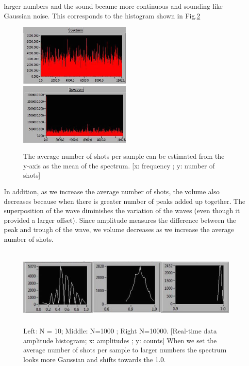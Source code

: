 \documentclass[authoryear, 12pt,5p, times]{elsarticle}
\begin{document}
larger numbers and the sound became more continuous and sounding like Gaussian noise. This corresponds to the histogram shown in Fig.\ref{shot}
 \begin{figure}[h!]
 \centering
 \includegraphics[width=0.5\textwidth]{figure/N_1000_shot_spectrum.JPG}
  \includegraphics[width=0.5\textwidth]{figure/N_100000_shot_spectrum.JPG} 
\caption{The average number of shots per sample can be estimated from the y-axis as the mean of the spectrum. [x: frequency ; y: number of shots] }
\label{spectrum}
 \end{figure}
 \par In addition, as we increase the average number of shots, the volume also decreases because when there is greater number of peaks added up together. The superposition of the wave diminishes the variation of the waves (even though it provided a larger offset). Since amplitude measures the difference between the peak and trough of the wave, we volume decreases as we increase the average number of shots. 
 \begin{figure}[h!]
  \includegraphics[width=\textwidth,height=4cm]{figure/shot.png}
\caption{Left: N = 10; Middle: N=1000 ; Right N=10000.  [Real-time data amplitude histogram; x: amplitudes ; y: counts] When we set the average number of shots per sample to larger numbers the spectrum looks more Gaussian and shifts towards the 1.0.}
\label{shot}
\end{figure}
\end{document}

